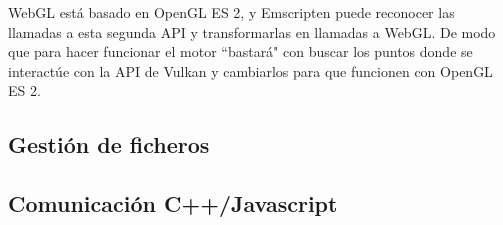 WebGL está basado en OpenGL ES 2, y Emscripten puede reconocer las llamadas a esta segunda API y transformarlas en llamadas a WebGL. De modo que para hacer funcionar el motor ``bastará" con buscar los puntos donde se interactúe con la API de Vulkan y cambiarlos para que funcionen con OpenGL ES 2.

\subsection{Gestión de ficheros}

\subsection{Comunicación C++/Javascript}
